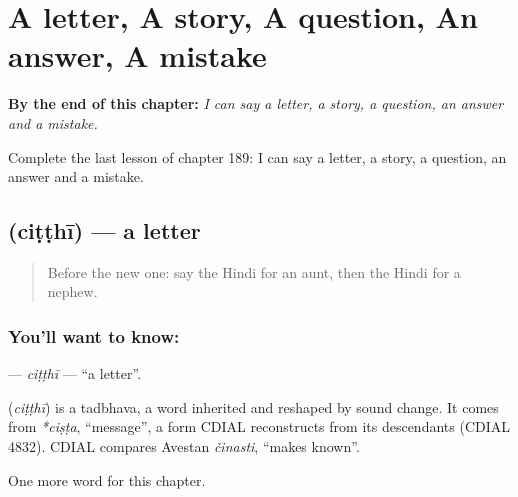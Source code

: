 
\chapter{A letter, A story, A question, An answer, A mistake}
\label{ch:hi-a-letter-a-story-a-question-an-answer-a-mistake}

\begin{chapteropening}
\textbf{By the end of this chapter:} \emph{I can say a letter, a story, a question, an answer and a mistake.}

Complete the last lesson of chapter 189: I can say a letter, a story, a question, an answer and a mistake.
\end{chapteropening}

\section[\texorpdfstring{\hi{चिट्ठी} (ciṭṭhī)}{चिट्ठी (ciṭṭhī)}]{ (ciṭṭhī) — a letter}

\label{lesson:HI-C189-citthi}



\begin{quote}
Before the new one: say the Hindi for an aunt, then the Hindi for a nephew.
\end{quote}

\subsection*{You'll want to know: }
\textbf{} — \emph{ciṭṭhī} — \textquotedblleft{}a letter\textquotedblright{}.

\begin{cousinweb}
\textbf{} (\emph{ciṭṭhī}) is a tadbhava, a word inherited and reshaped by sound change. It comes from \emph{*ciṣṭa}, \textquotedblleft{}message\textquotedblright{}, a form CDIAL reconstructs from its descendants (CDIAL 4832). CDIAL compares Avestan \emph{činasti}, \textquotedblleft{}makes known\textquotedblright{}.
\end{cousinweb}

\begin{grammarlens}[title={What you've built}]
One more word for this chapter.
\end{grammarlens}

